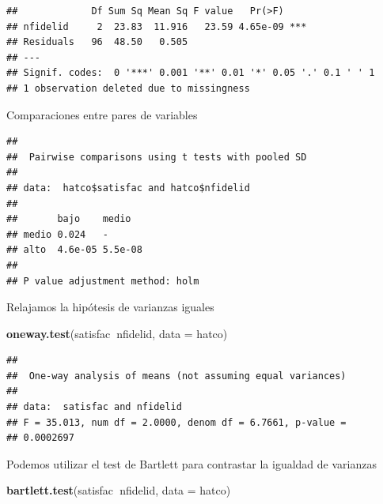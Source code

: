 \documentclass[]{book}
\newenvironment{Shaded}{\begin{snugshade}}{\end{snugshade}}
\newcommand{\KeywordTok}[1]{\textcolor[rgb]{0.13,0.29,0.53}{\textbf{#1}}}
\newcommand{\DataTypeTok}[1]{\textcolor[rgb]{0.13,0.29,0.53}{#1}}
\newcommand{\OperatorTok}[1]{\textcolor[rgb]{0.81,0.36,0.00}{\textbf{#1}}}
\newcommand{\NormalTok}[1]{#1}
\begin{document}
\begin{verbatim}
##             Df Sum Sq Mean Sq F value   Pr(>F)    
## nfidelid     2  23.83  11.916   23.59 4.65e-09 ***
## Residuals   96  48.50   0.505                     
## ---
## Signif. codes:  0 '***' 0.001 '**' 0.01 '*' 0.05 '.' 0.1 ' ' 1
## 1 observation deleted due to missingness
\end{verbatim}

Comparaciones entre pares de variables

\begin{Shaded}
\end{Shaded}

\begin{verbatim}
## 
##  Pairwise comparisons using t tests with pooled SD 
## 
## data:  hatco$satisfac and hatco$nfidelid 
## 
##       bajo    medio  
## medio 0.024   -      
## alto  4.6e-05 5.5e-08
## 
## P value adjustment method: holm
\end{verbatim}

Relajamos la hipótesis de varianzas iguales

\begin{Shaded}
\begin{Highlighting}[]
\KeywordTok{oneway.test}\NormalTok{(satisfac}\OperatorTok{~}\NormalTok{nfidelid, }\DataTypeTok{data =}\NormalTok{ hatco)}
\end{Highlighting}
\end{Shaded}

\begin{verbatim}
## 
##  One-way analysis of means (not assuming equal variances)
## 
## data:  satisfac and nfidelid
## F = 35.013, num df = 2.0000, denom df = 6.7661, p-value =
## 0.0002697
\end{verbatim}

Podemos utilizar el test de Bartlett para contrastar la igualdad de
varianzas

\begin{Shaded}
\begin{Highlighting}[]
\KeywordTok{bartlett.test}\NormalTok{(satisfac}\OperatorTok{~}\NormalTok{nfidelid, }\DataTypeTok{data =}\NormalTok{ hatco)}
\end{Highlighting}
\end{Shaded}
\end{document}
